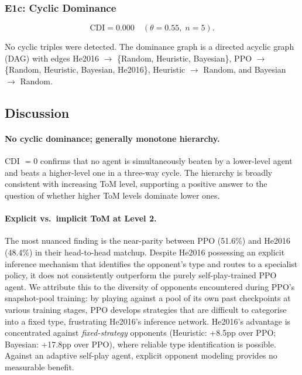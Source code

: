 \documentclass{article}
\begin{document}
  \subsubsection{E1c: Cyclic Dominance}

  \[
    \mathrm{CDI} = 0.000 \quad (\theta = 0.55,\; n = 5).
  \]

  No cyclic triples were detected. The dominance graph is a directed acyclic graph
  (DAG) with edges He2016 $\to$ \{Random, Heuristic, Bayesian\}, PPO $\to$
  \{Random, Heuristic, Bayesian, He2016\}, Heuristic $\to$ Random, and Bayesian
  $\to$ Random.

  \subsection{Discussion}

  \paragraph{No cyclic dominance; generally monotone hierarchy.}
  CDI $= 0$ confirms that no agent is simultaneously beaten by a lower-level agent
  and beats a higher-level one in a three-way cycle. The hierarchy is broadly
  consistent with increasing ToM level, supporting a positive answer to the
  question of whether higher ToM levels dominate lower ones.

  \paragraph{Explicit vs.\ implicit ToM at Level 2.}
  The most nuanced finding is the near-parity between PPO (51.6\%) and He2016
  (48.4\%) in their head-to-head matchup. Despite He2016 possessing an explicit
  inference mechanism that identifies the opponent's type and routes to a
  specialist policy, it does not consistently outperform the purely self-play-trained
  PPO agent. We attribute this to the diversity of opponents encountered during
  PPO's snapshot-pool training: by playing against a pool of its own past
  checkpoints at various training stages, PPO develops strategies that are
  difficult to categorise into a fixed type, frustrating He2016's inference
  network. He2016's advantage is concentrated against \emph{fixed-strategy}
  opponents (Heuristic: +8.5pp over PPO; Bayesian: +17.8pp over PPO), where
  reliable type identification is possible. Against an adaptive self-play agent,
  explicit opponent modeling provides no measurable benefit.
\end{document}
